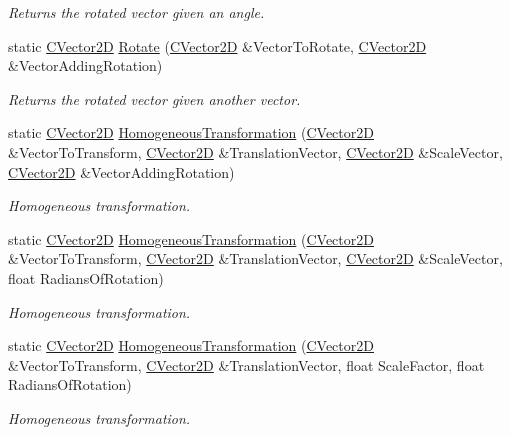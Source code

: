 \begin{DoxyCompactItemize}
\begin{DoxyCompactList}\small\item\em Returns the rotated vector given an angle. \end{DoxyCompactList}\item 
static \hyperlink{struct_c_vector2_d}{C\+Vector2D} \hyperlink{struct_c_matrix2_d_aca00561812d200d1a6f34eef07c2dec8}{Rotate} (\hyperlink{struct_c_vector2_d}{C\+Vector2D} \&Vector\+To\+Rotate, \hyperlink{struct_c_vector2_d}{C\+Vector2D} \&Vector\+Adding\+Rotation)
\begin{DoxyCompactList}\small\item\em Returns the rotated vector given another vector. \end{DoxyCompactList}\item 
static \hyperlink{struct_c_vector2_d}{C\+Vector2D} \hyperlink{struct_c_matrix2_d_a14c8ff4e88154c65c82917130a294028}{Homogeneous\+Transformation} (\hyperlink{struct_c_vector2_d}{C\+Vector2D} \&Vector\+To\+Transform, \hyperlink{struct_c_vector2_d}{C\+Vector2D} \&Translation\+Vector, \hyperlink{struct_c_vector2_d}{C\+Vector2D} \&Scale\+Vector, \hyperlink{struct_c_vector2_d}{C\+Vector2D} \&Vector\+Adding\+Rotation)
\begin{DoxyCompactList}\small\item\em Homogeneous transformation. \end{DoxyCompactList}\item 
static \hyperlink{struct_c_vector2_d}{C\+Vector2D} \hyperlink{struct_c_matrix2_d_ad4f221de368265a80651077ae0852d22}{Homogeneous\+Transformation} (\hyperlink{struct_c_vector2_d}{C\+Vector2D} \&Vector\+To\+Transform, \hyperlink{struct_c_vector2_d}{C\+Vector2D} \&Translation\+Vector, \hyperlink{struct_c_vector2_d}{C\+Vector2D} \&Scale\+Vector, float Radians\+Of\+Rotation)
\begin{DoxyCompactList}\small\item\em Homogeneous transformation. \end{DoxyCompactList}\item 
static \hyperlink{struct_c_vector2_d}{C\+Vector2D} \hyperlink{struct_c_matrix2_d_a7fd61cf2fc8cfce70f2712c634f2ac85}{Homogeneous\+Transformation} (\hyperlink{struct_c_vector2_d}{C\+Vector2D} \&Vector\+To\+Transform, \hyperlink{struct_c_vector2_d}{C\+Vector2D} \&Translation\+Vector, float Scale\+Factor, float Radians\+Of\+Rotation)
\begin{DoxyCompactList}\small\item\em Homogeneous transformation. \end{DoxyCompactList}\end{DoxyCompactItemize}

